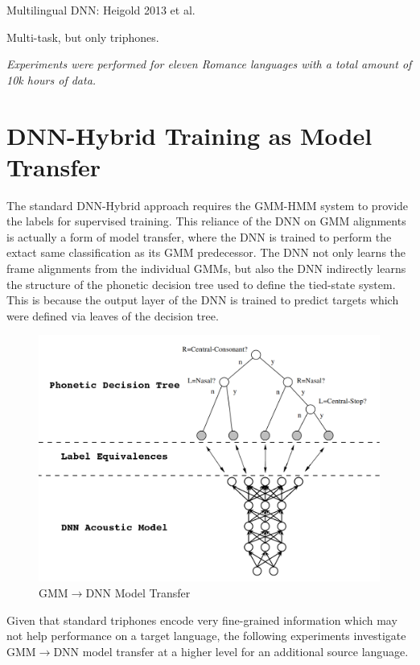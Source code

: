\documentclass[a4paper]{article}
\begin{document}
Multilingual DNN: Heigold 2013 et al.

Multi-task, but only triphones.

\textit{Experiments were performed for eleven Romance languages with a total amount  of  10k  hours  of  data.}

\section{DNN-Hybrid Training as Model Transfer}

The standard DNN-Hybrid approach requires the GMM-HMM system to provide the labels for supervised training. This reliance of the DNN on GMM alignments is actually a form of model transfer, where the DNN is trained to perform the extact same classification as its GMM predecessor. The DNN not only learns the frame alignments from the individual GMMs, but also the DNN indirectly learns the structure of the phonetic decision tree used to define the tied-state system. This is because the output layer of the DNN is trained to predict targets which were defined via leaves of the decision tree.


\begin{figure}[!htb]
  \centering
{}
  \includegraphics[width=\linewidth]{figs/tree-net.png}
  \caption{GMM$\rightarrow$DNN Model Transfer}
\endminipage\hfill
\end{figure}


Given that standard triphones encode very fine-grained information which may not help performance on a target language, the following experiments investigate GMM$\rightarrow$DNN model transfer at a higher level for an additional source language. 
\end{document}
